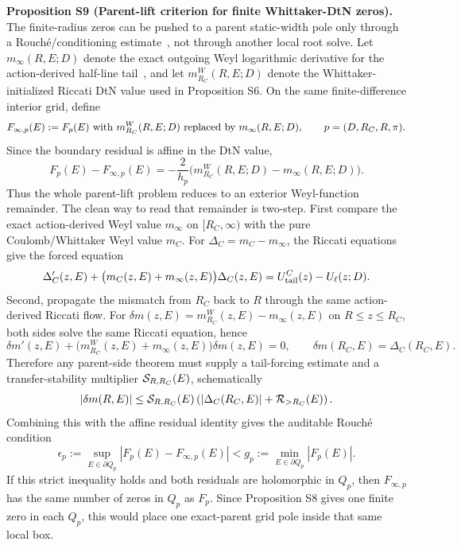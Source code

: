 \documentclass[aps,prd,onecolumn,notitlepage,nofootinbib,superscriptaddress,11pt,floatfix]{revtex4-2}
\begin{document}
\medskip\noindent\textbf{Proposition S9 (Parent-lift criterion for finite Whittaker-DtN zeros).}
The finite-radius zeros can be pushed to a parent static-width pole only through a Rouché/conditioning estimate~\cite{Ahlfors1979}, not through another local root solve.  Let \(m_\infty(R,E;D)\) denote the exact outgoing Weyl logarithmic derivative for the action-derived half-line tail~\cite{Teschl2014}, and let \(m_{R_C}^{W}(R,E;D)\) denote the Whittaker-initialized Riccati DtN value used in Proposition S6.  On the same finite-difference interior grid, define
\[
F_{\infty,p}(E)
:=F_p(E)\ \hbox{with }m_{R_C}^{W}(R,E;D)
\hbox{ replaced by }m_\infty(R,E;D),
\qquad p=(D,R_C,R,\pi).
\]
Since the boundary residual is affine in the DtN value,
\[
F_p(E)-F_{\infty,p}(E)
=-\frac{2}{h_p}
\bigl(m_{R_C}^{W}(R,E;D)-m_\infty(R,E;D)\bigr).
\]
Thus the whole parent-lift problem reduces to an exterior Weyl-function remainder.  The clean way to read that remainder is two-step.  First compare the exact action-derived Weyl value \(m_\infty\) on \([R_C,\infty)\) with the pure Coulomb/Whittaker Weyl value \(m_C\).  For
\(\Delta_C=m_C-m_\infty\), the Riccati equations give the forced equation
\[
\Delta_C'(z,E)
+\bigl(m_C(z,E)+m_\infty(z,E)\bigr)\Delta_C(z,E)
=U_{\rm tail}^{C}(z)-U_\ell(z;D).
\]
Second, propagate the mismatch from \(R_C\) back to \(R\) through the same action-derived Riccati flow.  For
\(\delta m(z,E)=m_{R_C}^{W}(z,E)-m_\infty(z,E)\) on \(R\le z\le R_C\), both sides solve the same Riccati equation, hence
\[
\delta m'(z,E)
+\bigl(m_{R_C}^{W}(z,E)+m_\infty(z,E)\bigr)\delta m(z,E)=0,
\qquad
\delta m(R_C,E)=\Delta_C(R_C,E).
\]
Therefore any parent-side theorem must supply a tail-forcing estimate and a transfer-stability multiplier \({\cal S}_{R,R_C}(E)\), schematically
\[
|\delta m(R,E)|
\le
{\cal S}_{R,R_C}(E)
\left(
|\Delta_C(R_C,E)|
+{\cal R}_{>R_C}(E)
\right).
\]
Combining this with the affine residual identity gives the auditable Rouché condition
\[
\epsilon_p
:=\sup_{E\in\partial Q_p}|F_p(E)-F_{\infty,p}(E)|
<
g_p:=\min_{E\in\partial Q_p}|F_p(E)|.
\]
If this strict inequality holds and both residuals are holomorphic in \(Q_p\), then \(F_{\infty,p}\) has the same number of zeros in \(Q_p\) as \(F_p\).  Since Proposition S8 gives one finite zero in each \(Q_p\), this would place one exact-parent grid pole inside that same local box.
\end{document}
